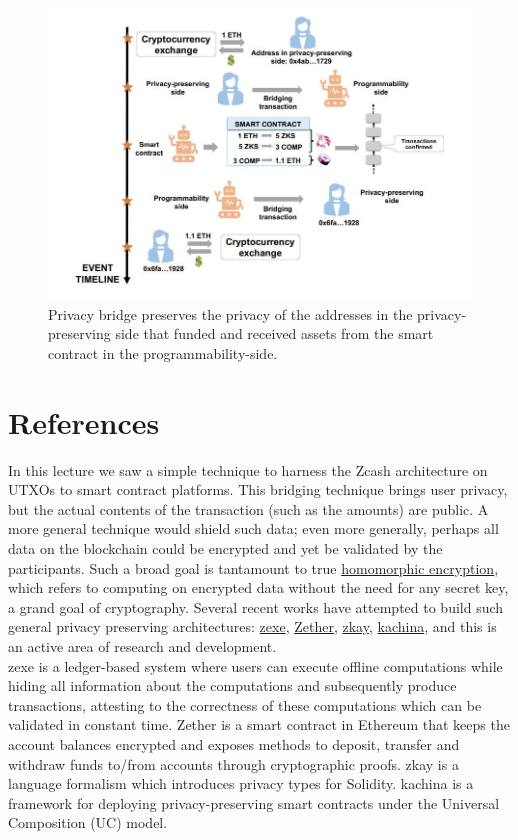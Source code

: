 \documentclass{report}
\begin{document}
\begin{center}
	\begin{figure}
		\centering
		\includegraphics[width=0.8\linewidth]{Fig/F9}
		\caption{
			Privacy bridge preserves the privacy of the addresses in the privacy-preserving side that funded and received assets from the smart contract in the programmability-side.
		}
		\label{fig:f9}
	\end{figure}
\end{center}
\section{References}
In this lecture we saw a simple technique to harness the Zcash architecture on UTXOs to smart contract platforms. This bridging technique brings user privacy, but the actual contents of the transaction (such as the amounts) are public. A more general technique would shield such data; even more generally, perhaps all data on the blockchain could be encrypted and yet be validated by the participants. Such a broad goal is tantamount to true \href{https://en.wikipedia.org/wiki/Homomorphic_encryption}{homomorphic encryption}, which refers to computing on encrypted data without the need for any secret key, a grand goal of cryptography. Several recent works have attempted to build such general privacy preserving architectures: \href{https://eprint.iacr.org/2018/962.pdf}{zexe}, \href{https://eprint.iacr.org/2019/191}{Zether}, \href{https://github.com/eth-sri/zkay}{zkay}, \href{https://eprint.iacr.org/2020/543}{kachina}, and this is an active area of research and development.\\
zexe is a ledger-based system where users can execute offline computations while hiding all information about the computations and subsequently produce transactions, attesting to the correctness of these computations which can be validated in constant time. Zether is a smart contract in Ethereum that keeps the account balances encrypted and exposes methods to deposit, transfer and withdraw funds to/from accounts through cryptographic proofs. zkay is a language formalism which introduces privacy types for Solidity. kachina is a framework for deploying privacy-preserving smart contracts under the Universal Composition (UC) model.
\end{document}
